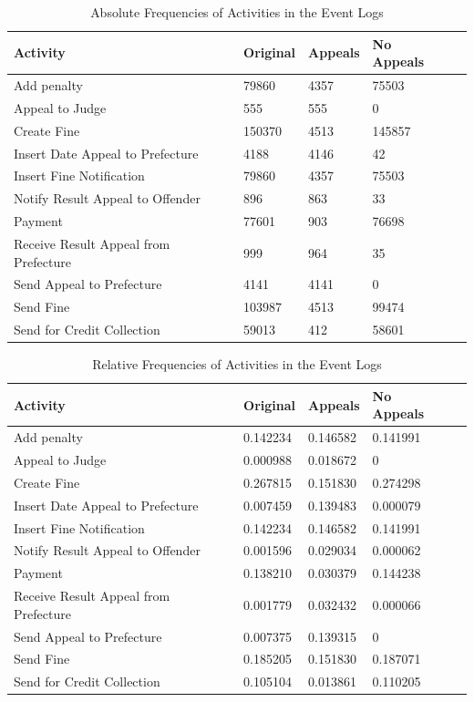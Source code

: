\documentclass[12pt]{report}
\begin{document}
\begin{table}[H]
\centering
\begin{tabular}{|l|l|l|l|l|}
\hline \textbf{Activity} & \textbf{Original} & \textbf{Appeals} & \textbf{No Appeals} \\
\hline Add penalty & 79860 & 4357 & 75503\\
\hline Appeal to Judge & 555 & 555 &0\\
\hline Create Fine & 150370 & 4513 & 145857\\
\hline Insert Date Appeal to Prefecture & 4188 & 4146 & 42\\
\hline Insert Fine Notification & 79860 & 4357 & 75503\\
\hline Notify Result Appeal to Offender & 896 & 863 & 33\\
\hline Payment  & 77601 & 903 & 76698\\
\hline Receive Result Appeal from Prefecture & 999 & 964 & 35\\
\hline Send Appeal to Prefecture  & 4141 & 4141 & 0\\
\hline Send Fine  & 103987 & 4513 & 99474\\
\hline Send for Credit Collection & 59013 & 412 & 58601\\
\hline
\end{tabular}
\caption{Absolute Frequencies of Activities in the Event Logs}
\label{tab:1c_absolut}
\end{table}

\begin{table}[H]
\centering
\begin{tabular}{|l|l|l|l|l|}
\hline \textbf{Activity} & \textbf{Original} & \textbf{Appeals} & \textbf{No Appeals} \\
\hline Add penalty & 0.142234 & 0.146582 & 0.141991\\
\hline Appeal to Judge & 0.000988 & 0.018672 &0\\
\hline Create Fine & 0.267815 & 0.151830 & 0.274298\\
\hline Insert Date Appeal to Prefecture & 0.007459 & 0.139483 & 0.000079\\
\hline Insert Fine Notification & 0.142234 & 0.146582 & 0.141991\\
\hline Notify Result Appeal to Offender & 0.001596 & 0.029034 & 0.000062\\
\hline Payment  & 0.138210 & 0.030379 & 0.144238\\
\hline Receive Result Appeal from Prefecture & 0.001779 & 0.032432 & 0.000066\\
\hline Send Appeal to Prefecture  & 0.007375 & 0.139315 & 0\\
\hline Send Fine  & 0.185205 & 0.151830 & 0.187071\\
\hline Send for Credit Collection & 0.105104 & 0.013861 & 0.110205\\
\hline
\end{tabular}
\caption{Relative Frequencies of Activities in the Event Logs}
\label{tab:1c_relative}
\end{table}
\end{document}
